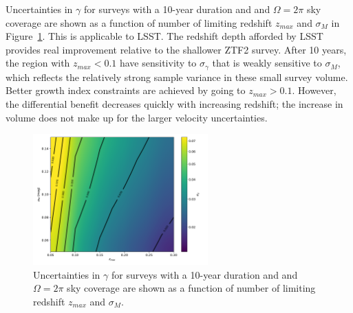 \documentclass[11pt, oneside]{article}   	%
\begin{document}
Uncertainties in $\gamma$ for surveys with a 10-year duration and  and $\Omega=2\pi$ sky coverage 
are shown as a function of number of limiting  redshift $z_{max}$ and $\sigma_M$ in Figure~\ref{lsst:fig}.
This is applicable to LSST.
The redshift depth afforded by LSST provides real improvement relative to the shallower ZTF2 survey.
After 10 years, the region with $z_{max}<0.1$ have sensitivity to  $\sigma_\gamma$ that is weakly sensitive to $\sigma_M$, 
which reflects the relatively strong sample variance in these small survey volume.  Better growth index constraints
are achieved by going to $z_{max}>0.1$.  However, the differential benefit decreases quickly with increasing redshift;
the increase in volume does not make up for the larger velocity uncertainties.

\begin{figure}
\centering
\includegraphics[width=0.6\textwidth]{src/surface2.pdf}
\caption{Uncertainties in $\gamma$ for surveys with a 10-year duration and  and $\Omega=2\pi$ sky coverage 
are shown as a function of number of limiting  redshift $z_{max}$ and $\sigma_M$.
\label{lsst:fig}}
\end{figure}
\end{document}
